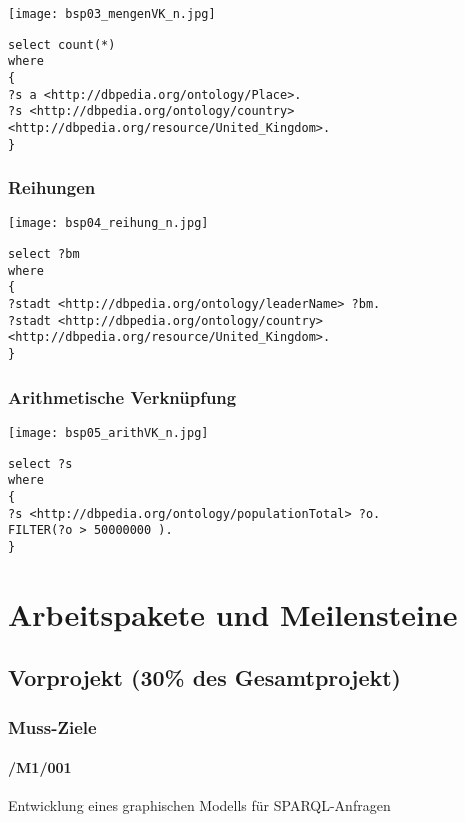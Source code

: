 \texttt{[image: bsp03\_mengenVK\_n.jpg]}

{\footnotesize
\begin{verbatim}
select count(*)
where
{
?s a <http://dbpedia.org/ontology/Place>.
?s <http://dbpedia.org/ontology/country> <http://dbpedia.org/resource/United_Kingdom>.
}
\end{verbatim}
}

\pagebreak

\subsubsection*{Reihungen}

\texttt{[image: bsp04\_reihung\_n.jpg]}

{\footnotesize
\begin{verbatim}
select ?bm
where
{
?stadt <http://dbpedia.org/ontology/leaderName> ?bm.
?stadt <http://dbpedia.org/ontology/country> <http://dbpedia.org/resource/United_Kingdom>.
}
\end{verbatim}
}

\subsubsection*{Arithmetische Verknüpfung}

\texttt{[image: bsp05\_arithVK\_n.jpg]}

\begin{verbatim}
select ?s
where
{
?s <http://dbpedia.org/ontology/populationTotal> ?o.
FILTER(?o > 50000000 ).
}
\end{verbatim}




\section{Arbeitspakete und Meilensteine}

\subsection{Vorprojekt (30\% des Gesamtprojekt)}

\subsubsection*{Muss-Ziele}

\paragraph{/M1/001} Entwicklung eines graphischen Modells für SPARQL-Anfragen
